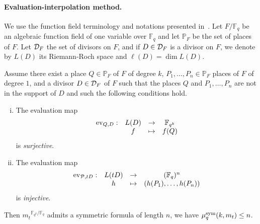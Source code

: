 \documentclass[11pt]{article}
\begin{document}
\paragraph{Evaluation-interpolation method.}
We use the function field terminology and notations
presented in~\cite{Stichtenoth09}. Let $F/\mathbb{F}_q$ be an algebraic
function field of one variable over $\mathbb{F}_{q}$ and let $\mathbb{P}_F$ be the
set of places of $F$. Let $\mathcal{D}_F$ the set of
divisors on $F$, and if $D\in\mathcal{D}_F$ is a divisor on
$F$, we denote by $L(D)$ its Riemann-Roch space and $\ell(D)=\dim L(D)$.

\begin{prop}
  \label{prop:method}
  Assume there exist a place $Q\in\mathbb{P}_{F}$ of $F$ of degree $k$, $P_1,
  \dots, P_n\in\mathbb{P}_F$ places of $F$ of degree $1$, and a divisor
  $D\in\mathcal{D}_F$ of $F$ such that the places $Q$ and $P_1, \dots, P_n$ are not in
  the support of $D$ and such the following conditions hold.
  \begin{enumerate}[(i)]
    \item \label{cond:1} The evaluation map
      \[
        \begin{array}{cccc}
        \operatorname{ev}_{Q, D}: & L(D) & \to & \mathbb{F}_{q^k}\\
  & f & \mapsto & f(Q)
\end{array}
\]
is \emph{surjective}.
    \item \label{cond:2} The evaluation map
      \[
        \begin{array}{cccc}
        \operatorname{ev}_{\mathcal{P}, tD}: & L(tD) & \to & (\mathbb{F}_{q})^n\\
  & h & \mapsto & (h(P_1), \dots, h(P_n))
\end{array}
\]
is \emph{injective}.
  \end{enumerate}
  Then ${m_t}^{\mathbb{F}_{q^k}/\mathbb{F}_q}$ admits a symmetric formula of length $n$, \ie we have $\mu^{\textrm{sym}}_q(k,m_t)\leq n$.
\end{prop}
\end{document}
